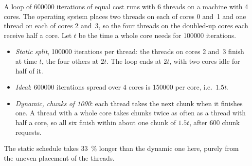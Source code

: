 \documentclass[../main.tex]{subfiles}
\begin{document}
\begin{example}
  \label{ex:l02-schedule}
  A loop of \num{600000} iterations of equal cost runs with 6 threads on a
  machine with 4 cores.  The operating system places two threads on each
  of cores 0 and~1 and one thread on each of cores 2 and~3, so the four
  threads on the doubled-up cores each receive half a core.  Let $t$ be the
  time a whole core needs for \num{100000} iterations.
  \begin{itemize}
    \item \emph{Static split}, \num{100000} iterations per thread: the
      threads on cores 2 and~3 finish at time $t$, the four others at
      $2t$.  The loop ends at $2t$, with two cores idle for half of it.
    \item \emph{Ideal}: \num{600000} iterations spread over 4 cores is
      \num{150000} per core, i.e.\ $1.5t$.
    \item \emph{Dynamic, chunks of \num{1000}}: each thread takes the next
      chunk when it finishes one.  A thread with a whole core takes chunks
      twice as often as a thread with half a core, so all six finish within
      about one chunk of $1.5t$, after \num{600} chunk requests.
  \end{itemize}
  The static schedule takes \SI{33}{\percent} longer than the dynamic
  one here, purely from the uneven placement of the threads.
\end{example}
\end{document}
